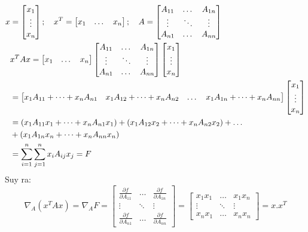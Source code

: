 \begin{align}
x & = 
\begin{bmatrix}
x_1 \\ \vdots \\ x_n
\end{bmatrix};\quad 
x^T = 
\begin{bmatrix}
x_1 & \dots & x_n
\end{bmatrix};\quad 
A = 
\begin{bmatrix}
A_{11} & \dots & A_{1n}\\ 
\vdots & \ddots & \vdots\\ 
A_{n1} & \dots & A_{nn}
\end{bmatrix}\notag\\
& x^TAx  = 
\begin{bmatrix}
x_1 & \dots & x_n
\end{bmatrix} 
\begin{bmatrix}
A_{11} & \dots & A_{1n}\\ 
\vdots & \ddots & \vdots\\ 
A_{n1} & \dots & A_{nn}
\end{bmatrix}
\begin{bmatrix}
x_1 \\ \vdots \\ x_n
\end{bmatrix}\notag\\
& = 
\begin{bmatrix}
x_1A_{11} + \dots + x_nA_{n1} & x_1A_{12} + \dots + x_nA_{n2} & \dots &
x_1A_{1n} + \dots + x_nA_{nn}
\end{bmatrix} 
\begin{bmatrix}
x_1 \\ \vdots \\ x_n
\end{bmatrix}\notag\\
& = (x_1A_{11}x_1 + \dots + x_nA_{n1}x_1) + (x_1A_{12}x_2 + \dots + x_nA_{n2}x_2) +
\dots \notag\\ & + (x_1A_{1n}x_n + \dots + x_nA_{nn}x_n)\notag\\
& = \sum_{i=1}^{n} \sum_{j=1}^{n} x_iA_{ij}x_j = F\notag
\end{align}
Suy ra:
\[ \nabla_A(x^TAx) = \nabla_AF = 
\begin{bmatrix}
  \frac{\partial f}{\partial A_{11}} & \dots & \frac{\partial f}{\partial
  A_{1n}}\\
  \vdots & \ddots & \vdots \\
  \frac{\partial f}{\partial A_{n1}} & \dots & \frac{\partial f}{\partial
  A_{nn}}  
   \end{bmatrix}
 = 
\begin{bmatrix}
x_1x_1 & \dots & x_1x_n\\ 
\vdots & \ddots & \vdots\\ 
x_nx_1 & \dots & x_nx_n
\end{bmatrix}
= x.x^T
 \]
